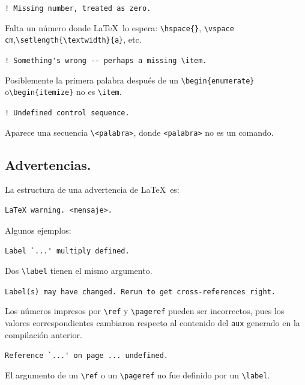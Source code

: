 \begin{list}{}{\setlength{\leftmargin}{0pt}}
\item \verb+! Missing number, treated as zero.+

Falta un n{\'u}mero donde \LaTeX\ lo espera: \verb+\hspace{}+,
\verb+\vspace cm+,\linebreak \verb+\setlength{\textwidth}{a}+, etc.

\item \verb+! Something's wrong -- perhaps a missing \item.+

Posiblemente la primera palabra despu{\'e}s de un
\verb+\begin{enumerate}+ o\linebreak \verb+\begin{itemize}+ no es \verb+\item+. 

\item \verb+! Undefined control sequence.+

Aparece una secuencia \verb+\<palabra>+, donde \verb+<palabra>+ no es
un comando.

\end{list}

\subsection{Advertencias.}
\label{advertencias}

La estructura de una advertencia de \LaTeX\ es:
\begin{verbatim}
LaTeX warning. <mensaje>.
\end{verbatim}

Algunos ejemplos:

\begin{list}{}{\setlength{\leftmargin}{0pt}}
\item \verb+Label `...' multiply defined.+

Dos \verb+\label+ tienen el mismo argumento.

\item \verb+Label(s) may have changed. Rerun to get cross-references right.+ 

Los n{\'u}meros impresos por \verb+\ref+ y \verb+\pageref+ pueden ser
incorrectos, pues los valores correspondientes cambiaron respecto al
contenido del \verb+aux+ generado en la compilaci{\'o}n anterior.

\item \verb+Reference `...' on page ... undefined.+

El argumento de un \verb+\ref+ o un \verb+\pageref+ no fue definido
por un \verb+\label+.

\end{list}

